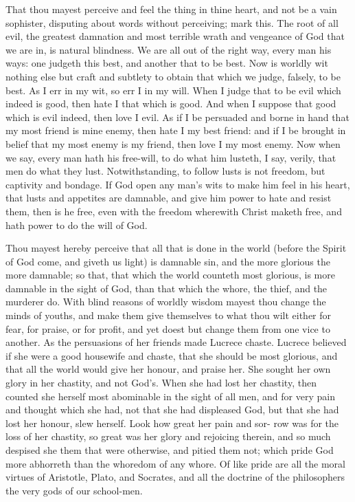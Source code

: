 \documentclass{custom}
\begin{document}
That thou mayest perceive and feel the thing in thine 
heart, and not be a vain sophister, disputing about words 
without perceiving; mark this. The root of all evil, the 
greatest damnation and most terrible wrath and vengeance 
of God that we are in, is natural blindness. We are all 
out of the right way, every man his ways: one judgeth 
this best, and another that to be best. Now is worldly
wit nothing else but craft and subtlety to obtain that which 
we judge, falsely, to be best. As I err in my wit, so err I
in my will. When I judge that to be evil which indeed
is good, then hate I that which is good. And when I 
suppose that good which is evil indeed, then love I evil. 
As if I be persuaded and borne in hand that my most 
friend is mine enemy, then hate I my best friend: and if 
I be brought in belief that my most enemy is my friend, 
then love I my most enemy. Now when we say, every 
man hath his free-will, to do what him lusteth, I say, 
verily, that men do what they lust. Notwithstanding, to 
follow lusts is not freedom, but captivity and bondage. 
If God open any man's wits to make him feel in his heart, 
that lusts and appetites are damnable, and give him power 
to hate and resist them, then is he free, even with the 
freedom wherewith Christ maketh free, and hath power 
to do the will of God. 

Thou mayest hereby perceive that all that is done in the
world (before the Spirit of God come, and giveth us light) 
is damnable sin, and the more glorious the more damnable;
so that, that which the world counteth most glorious, is 
more damnable in the sight of God, than that which the 
whore, the thief, and the murderer do. With blind reasons 
of worldly wisdom mayest thou change the minds of youths,
and make them give themselves to what thou wilt either for 
fear, for praise, or for profit, and yet doest but change 
them from one vice to another. As the persuasions of 
her friends made Lucrece chaste. Lucrece believed if 
she were a good housewife and chaste, that she should be 
most glorious, and that all the world would give her 
honour, and praise her. She sought her own glory in her 
chastity, and not God's. When she had lost her chastity, 
then counted she herself most abominable in the sight of 
all men, and for very pain and thought which she had, 
not that she had displeased God, but that she had lost her 
honour, slew herself. Look how great her pain and sor- 
row was for the loss of her chastity, so great was her glory 
and rejoicing therein, and so much despised she them that 
were otherwise, and pitied them not; which pride God 
more abhorreth than the whoredom of any whore. Of 
like pride are all the moral virtues of Aristotle, Plato, 
and Socrates, and all the doctrine of the philosophers the 
very gods of our school-men. 
\end{document}

